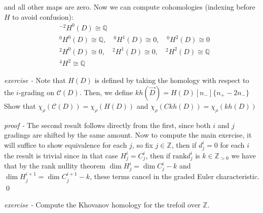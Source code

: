 \documentclass[11pt]{article}
\theoremstyle{definition}
\newcommand{\set}[1]{\{#1\}}
\begin{document}
    and all other maps are zero. Now we can compute cohomologies (indexing before \(H\) to avoid confusion):
    \begin{align*}
        &{}^{-2}H^0(D) \cong \mathbb{Q} \\
        &{}^0H^0(D) \cong \mathbb{Q}, \quad {}^0H^1(D) \cong 0, \quad {}^0H^2(D) \cong 0 \\
        &{}^2H^0(D) \cong 0, \quad {}^2H^1(D) \cong 0, \quad {}^2H^2(D) \cong \mathbb{Q} \\
        &{}^4H^2 \cong \mathbb{Q}
    \end{align*}

    
    \emph{exercise - } Note that \(H(D)\) is defined by taking the homology with respect to the \(i\)-grading on \(\mathcal{C}(D)\). Then, we define \(kh(\vec{D}) = H(D)[n_-]\set{n_+-2n_-}\)
    Show that \(\chi_\rho(\mathcal{C}(D)) = \chi_\rho(H(D))\) and \(\chi_\rho(Ckh(D)) = \chi_\rho(kh(D))\)

    \emph{proof - } The second result follows directly from the first, since both \(i\) and \(j\) gradings are shifted by the same amount. Now to compute the main exercise, it will suffice to show equivalence for each \(j\), so fix \(j \in \mathbb{Z}\), then if \(d_j^i = 0\) for each \(i\) the result is trivial since in that case \(H_j^i = C_j^i\), then if \(\text{rank}d_j^i\) is \(k \in \mathbb{Z}_{>0}\) we have that by the rank nullity theorem \(\dim H_j^i = \dim C_j^i - k\) and \(\dim H_j^{i+1} = \dim C_j^{i + 1} - k\), these terms cancel in the graded Euler characteristic. \qed

    
    \emph{exercise - } Compute the Khovanov homology for the trefoil over \(\mathbb{Z}\).
\end{document}
